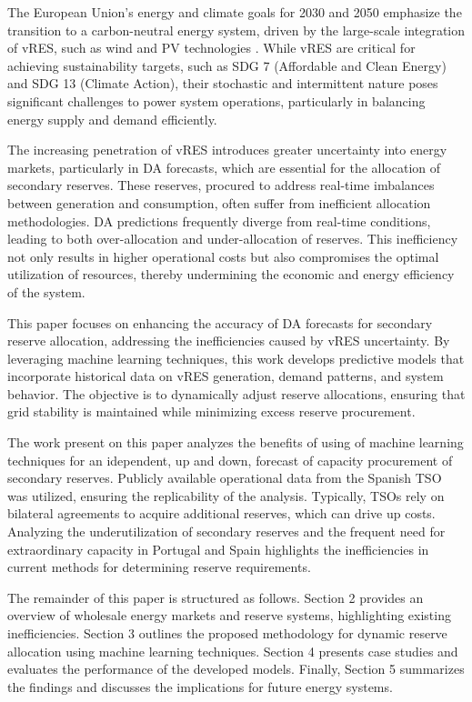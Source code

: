 The European Union's energy and climate goals for 2030 and 2050 emphasize the transition to a carbon-neutral energy system, driven by the large-scale integration of \gls{vRES}, such as wind and \gls{PV} technologies \cite{Perissi2022}. While \gls{vRES} are critical for achieving sustainability targets, such as SDG 7 (Affordable and Clean Energy) and SDG 13 (Climate Action), their stochastic and intermittent nature poses significant challenges to power system operations, particularly in balancing energy supply and demand efficiently.\cite{Ocker2017}\cite{Frade2019_wind}  \par
The increasing penetration of \gls{vRES} introduces greater uncertainty into energy markets, particularly in \gls{DA}  forecasts, which are essential for the allocation of secondary reserves. These reserves, procured to address real-time imbalances between generation and consumption, often suffer from inefficient allocation methodologies. \gls{DA} predictions frequently diverge from real-time conditions, leading to both over-allocation and under-allocation of reserves. This inefficiency not only results in higher operational costs but also compromises the optimal utilization of resources, thereby undermining the economic and energy efficiency of the system.\par
This paper focuses on enhancing the accuracy of \gls{DA}  forecasts for secondary reserve allocation, addressing the inefficiencies caused by \gls{vRES} uncertainty. By leveraging machine learning techniques, this work develops predictive models that incorporate historical data on \gls{vRES} generation, demand patterns, and system behavior. The objective is to dynamically adjust reserve allocations, ensuring that grid stability is maintained while minimizing excess reserve procurement.\par
The work present on this paper analyzes the benefits of using of machine learning techniques for an idependent, up and down, forecast of capacity procurement of secondary reserves. Publicly available operational data from the Spanish \gls{TSO} was utilized, ensuring the replicability of the analysis. Typically, \gls{TSO}s rely on bilateral agreements to acquire additional reserves, which can drive up costs. Analyzing the underutilization of secondary reserves and the frequent need for extraordinary capacity in Portugal and Spain highlights the inefficiencies in current methods for determining reserve requirements. \cite{EstanqueiroD5} \par
The remainder of this paper is structured as follows. Section 2 provides an overview of wholesale energy markets and reserve systems, highlighting existing inefficiencies. Section 3 outlines the proposed methodology for dynamic reserve allocation using machine learning techniques. Section 4 presents case studies and evaluates the performance of the developed models. Finally, Section 5 summarizes the findings and discusses the implications for future energy systems.\par

